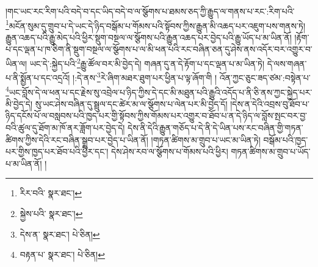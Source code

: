 །གང་ཡང་རང་རིག་པའི་བདེ་བ་དང་ཡིད་བདེ་བ་ལ་སྩོགས་པ་ཐམས་ཅད་ཀྱི་རྒྱུད་ལ་གནས་པ་རང་:རིག་པའི་\footnote{རིར་བའི་  སྣར་ཐང་། }མངོན་སུམ་དུ་གྲུབ་པ་དེ་ཡང་དེ་ཉིད་བསྒོམ་པ་གོམས་པའི་སྟོབས་ཀྱིས་རྒྱུན་མི་འཆད་པར་འཇུག་པས་གནས་ཏེ། རྒྱུན་འཆད་པའི་རྒྱུ་མེད་པའི་ཕྱིར་སྡུག་བསྔལ་ལ་སྩོགས་པའི་རྒྱུན་འཆད་པར་བྱེད་པའི་རྒྱུ་ཡོད་པ་མ་ཡིན་ནོ། །རྟོག་པ་དང་ལྡན་པ་ཁ་ཅིག་ནི་སྡུག་བསྔལ་ལ་སྩོགས་པ་ལ་མི་ཕན་པའི་རང་བཞིན་ཅན་དུ་ཤེས་ནས་འདོར་བར་འགྱུར་བ་ཡིན་ལ། ཡང་དེ་:སྐྱེད་པའི་\footnote{སྐྱེས་པའི་  སྣར་ཐང་། }རྒྱུ་ཚོལ་བར་མི་བྱེད་དེ། གཞན་དུ་ན་དེ་རྟོག་པ་དང་ལྡན་པ་མ་ཡིན་ཏེ། དེ་ལས་གཞན་པ་ནི་སྨྱོན་པ་དང་འདྲའོ། །:དེ་ནས་\footnote{དེས་ན་  སྣར་ཐང་།  པེ་ཅིན། }རེ་ཞིག་མཐར་ཐུག་པར་ཕྱིན་པ་ལྟ་ཞོག་གི ། འོན་ཀྱང་ཅུང་ཟད་ཙམ་:བསྟེན་པ་\footnote{བརྟན་པ་  སྣར་ཐང་།  པེ་ཅིན། }ཡང་བློས་དེ་ལ་ཕན་པ་དང་རྗེས་སུ་འབྲེལ་པ་ཉིད་ཀྱིས་དེ་དང་མི་མཐུན་པའི་རྒྱུའི་འདོད་པ་ནི་ཅི་ནས་ཀྱང་སྐྱེད་པར་མི་བྱེད་དེ། སུ་ཡང་ཤེས་བཞིན་དུ་སྦྲུལ་དང་ཚེར་མ་ལ་སྩོགས་པ་ལེན་པར་མི་བྱེད་དོ། །དེས་ན་དེའི་འབྲས་བུ་ཐོབ་པ་ཉིད་དངོས་པོ་ལ་བསླབས་པའི་ཁྱད་པར་གྱི་སྟོབས་ཀྱིས་གོམས་པར་འགྱུར་བ་ཐོབ་པ་ན་དེ་ཉིད་ལ་བློས་སྤང་བར་བྱ་བའི་ཚུལ་དུ་ཐོག་མ་ཁོ་ནར་ཟློག་པར་བྱེད་དེ། དེས་ནི་དེའི་རྒྱུན་གཅོད་པ་དེ་ནི་དེ་ཡིན་པས་རང་བཞིན་གྱི་གཏན་ཚིགས་ཀྱིས་དེའི་རང་བཞིན་སྒྲུབ་པར་བྱེད་པ་ཡིན་ནོ། །གཏན་ཚིགས་མ་གྲུབ་པ་ཡང་མ་ཡིན་ཏེ། བསྒོམ་པའི་ཁྱད་པར་གྱིས་ཁྱད་པར་ཐོབ་པའི་ཕྱིར་དང་། དེས་ཤེས་རབ་ལ་སྩོགས་པ་གོམས་པའི་ཕྱིར། གཏན་ཚིགས་མ་གྲུབ་པ་ཡོད་པ་མ་ཡིན་ནོ། །
